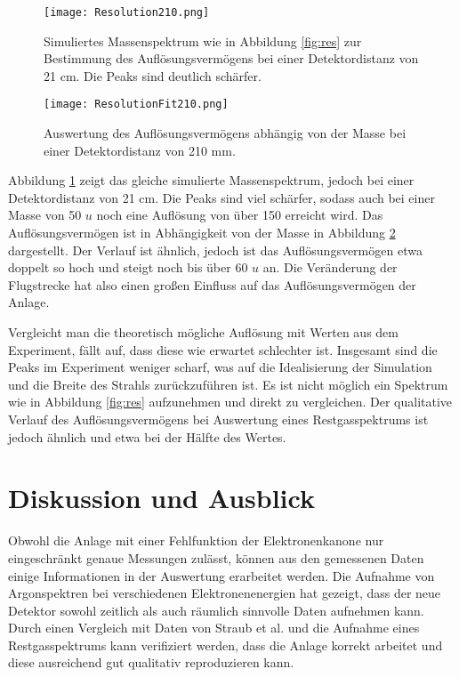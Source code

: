 \begin{figure}
    \centering
    \texttt{[image: Resolution210.png]}
    \caption[Simuliertes Massenspektrum (1–60 u, 210 mm) zur Auflösungsbestimmung]{Simuliertes Massenspektrum wie in Abbildung \ref{fig:res} zur Bestimmung des Auflösungsvermögens bei einer Detektordistanz von 21 cm. Die Peaks sind deutlich schärfer.}
    \label{fig:res21}
\end{figure}

\begin{figure}
    \centering
    \texttt{[image: ResolutionFit210.png]}
    \caption[Auswertung des Auflösungsvermögens abhängig von der Masse (210 mm)]{Auswertung des Auflösungsvermögens abhängig von der Masse bei einer Detektordistanz von 210 mm.}
    \label{fig:res_fit210}
\end{figure}

Abbildung \ref{fig:res21} zeigt das gleiche simulierte Massenspektrum, jedoch bei einer Detektordistanz von 21 cm. Die Peaks sind viel schärfer, sodass auch bei einer Masse von 50 $u$ noch eine Auflösung von über 150 erreicht wird. Das Auflösungsvermögen ist in Abhängigkeit von der Masse in Abbildung \ref{fig:res_fit210} dargestellt. Der Verlauf ist ähnlich, jedoch ist das Auflösungsvermögen etwa doppelt so hoch und steigt noch bis über 60 $u$ an. Die Veränderung der Flugstrecke hat also einen großen Einfluss auf das Auflösungsvermögen der Anlage.

Vergleicht man die theoretisch mögliche Auflösung mit Werten aus dem Experiment, fällt auf, dass diese wie erwartet schlechter ist. Insgesamt sind die Peaks im Experiment weniger scharf, was auf die Idealisierung der Simulation und die Breite des Strahls zurückzuführen ist. Es ist nicht möglich ein Spektrum wie in Abbildung \ref{fig:res} aufzunehmen und direkt zu vergleichen. Der qualitative Verlauf des Auflösungsvermögens bei Auswertung eines Restgasspektrums ist jedoch ähnlich und etwa bei der Hälfte des Wertes.


\section{Diskussion und Ausblick}
Obwohl die Anlage mit einer Fehlfunktion der Elektronenkanone nur eingeschränkt genaue Messungen zulässt, können aus den gemessenen Daten einige Informationen in der Auswertung erarbeitet werden. Die Aufnahme von Argonspektren bei verschiedenen Elektronenenergien hat gezeigt, dass der neue Detektor sowohl zeitlich als auch räumlich sinnvolle Daten aufnehmen kann. Durch einen Vergleich mit Daten von Straub et al. \cite{Straub} und die Aufnahme eines Restgasspektrums kann verifiziert werden, dass die Anlage korrekt arbeitet und diese ausreichend gut qualitativ reproduzieren kann. 

